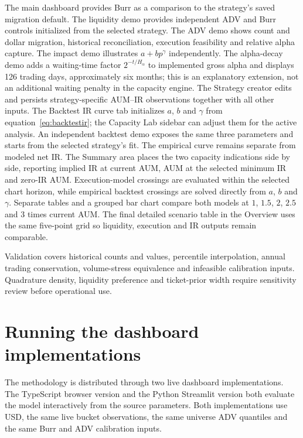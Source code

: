 \documentclass[11pt,a4paper]{article}
\numberwithin{equation}{section}
\begin{document}
The main dashboard provides Burr as a comparison to the strategy's saved migration default.
The liquidity demo provides independent ADV and Burr controls initialized from the selected
strategy. The ADV demo shows count and dollar migration, historical reconciliation, execution
feasibility and relative alpha capture. The impact demo illustrates $a+bp^\gamma$ independently.
The alpha-decay demo adds a waiting-time factor $2^{-t/H_\alpha}$ to implemented gross alpha
and displays 126 trading days, approximately six months; this is an explanatory extension,
not an additional waiting penalty in the capacity engine.
The Strategy creator edits and persists strategy-specific AUM--IR observations together with all
other inputs. The Backtest IR curve tab initializes $a$, $b$ and $\gamma$ from
equation~\eqref{eq:backtestir}; the Capacity Lab sidebar can adjust them for the active analysis.
An independent backtest demo exposes the same three parameters and starts from the selected
strategy's fit. The empirical curve remains separate from modeled net IR.
The Summary area places the two capacity indications side by side, reporting implied IR at current
AUM, AUM at the selected minimum IR and zero-IR AUM. Execution-model crossings are evaluated
within the selected chart horizon, while empirical backtest crossings are solved directly from
$a$, $b$ and $\gamma$. Separate tables and a grouped bar chart compare both models at
$1$, $1.5$, $2$, $2.5$ and $3$ times current AUM. The final detailed scenario table in the
Overview uses the same five-point grid so liquidity, execution and IR outputs remain comparable.

Validation covers historical counts and values, percentile interpolation, annual trading
conservation, volume-stress equivalence and infeasible calibration inputs. Quadrature density,
liquidity preference and ticket-prior width require sensitivity review before operational use.

\section{Running the dashboard implementations}\label{sec:running}
The methodology is distributed through two live dashboard implementations. The TypeScript browser
version and the Python Streamlit version both evaluate the model interactively from the source parameters.
Both implementations use USD, the same live bucket observations, the same universe ADV
quantiles and the same Burr and ADV calibration inputs.
\end{document}
